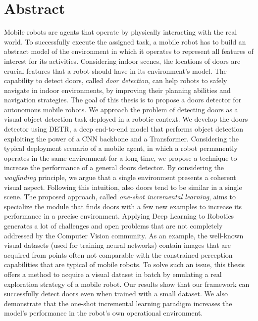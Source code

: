 \newpage
\chapter{Abstract}

Mobile robots are agents that operate by physically interacting with the real world. To successfully execute the assigned task, a mobile robot has to build an abstract model of the environment in which it operates to represent all features of interest for its activities. Considering indoor scenes, the locations of doors are crucial features that a robot should have in its environment's model. The capability to detect doors, called \emph{door detection}, can help robots to safely navigate in indoor environments, by improving their planning abilities and navigation strategies. The goal of this thesis is to propose a doors detector for autonomous mobile robots. We approach the problem of detecting doors as a visual object detection task deployed in a robotic context. We develop the doors detector using DETR, a deep end-to-end model that performs object detection exploiting the power of a CNN backbone and a Transformer. Considering the typical deployment scenario of a mobile agent, in which a robot permanently operates in the same environment for a long time, we propose a technique to increase the performance of a general doors detector. By considering the \textit{wayfinding} principle, we argue that a single environment presents a coherent visual aspect. Following this intuition, also doors tend to be similar in a single scene. The proposed approach, called \textit{one-shot incremental learning}, aims to specialize the module that finds doors with a few new examples to increase its performance in a precise environment. Applying Deep Learning to Robotics generates a lot of challenges and open problems that are not completely addressed by the Computer Vision community. As an example, the well-known visual datasets (used for training neural networks) contain images that are acquired from points often not comparable with the constrained perception capabilities that are typical of mobile robots. To solve such an issue, this thesis offers a method to acquire a visual dataset in batch by emulating a real exploration strategy of a mobile robot. Our results show that our framework can successfully detect doors even when trained with a small dataset. We also demonstrate that the one-shot incremental learning paradigm increases the model's performance in the robot's own operational environment.

